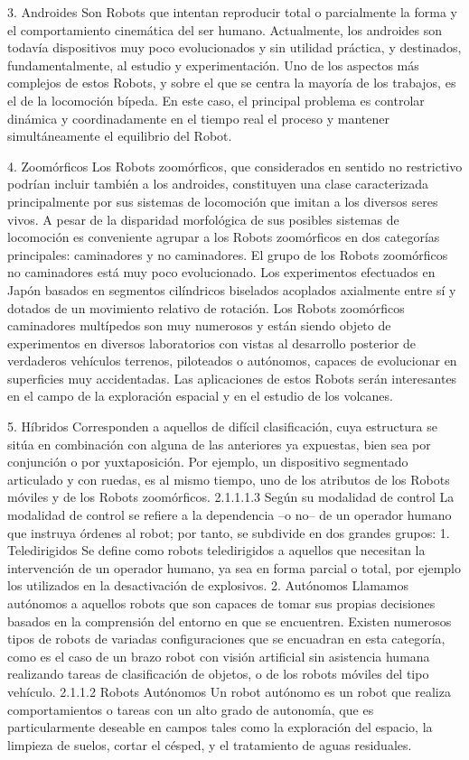 3. Androides
Son Robots que intentan reproducir total o parcialmente la forma y el comportamiento cinemática del ser humano. Actualmente, los androides son todavía dispositivos muy poco evolucionados y sin utilidad práctica, y destinados, fundamentalmente, al estudio y experimentación. Uno de los aspectos más complejos de estos Robots, y sobre el que se centra la mayoría de los trabajos, es el de la locomoción bípeda. En este caso, el principal problema es controlar dinámica y coordinadamente en el tiempo real el proceso y mantener simultáneamente el equilibrio del Robot.

4. Zoomórficos
Los Robots zoomórficos, que considerados en sentido no restrictivo podrían incluir también a los androides, constituyen una clase caracterizada principalmente por sus sistemas de locomoción que imitan a los diversos seres vivos. A pesar de la disparidad morfológica de sus posibles sistemas de locomoción es conveniente agrupar a los Robots zoomórficos en dos categorías principales: caminadores y no caminadores. El grupo de los Robots zoomórficos no caminadores está muy poco evolucionado. Los experimentos efectuados en Japón basados en segmentos cilíndricos biselados acoplados axialmente entre sí y dotados de un movimiento relativo de rotación. Los Robots zoomórficos caminadores multípedos son muy numerosos y están siendo objeto de experimentos en diversos laboratorios con vistas al desarrollo posterior de verdaderos vehículos terrenos, piloteados o autónomos, capaces de evolucionar en superficies muy accidentadas. Las aplicaciones de estos Robots serán interesantes en el campo de la exploración espacial y en el estudio de los volcanes.

5. Híbridos
Corresponden a aquellos de difícil clasificación, cuya estructura se sitúa en combinación con alguna de las anteriores ya expuestas, bien sea por conjunción o por yuxtaposición. Por ejemplo, un dispositivo segmentado articulado y con ruedas, es al mismo tiempo, uno de los atributos de los Robots móviles y de los Robots zoomórficos.
2.1.1.1.3	Según su modalidad de control
La modalidad de control se refiere a la dependencia –o no– de un operador humano que instruya órdenes al robot; por tanto, se subdivide en dos grandes grupos:
1.	Teledirigidos
Se define como robots teledirigidos a aquellos que necesitan la intervención de un operador humano, ya sea en forma parcial o total, por ejemplo los utilizados en la desactivación de explosivos.
2.	Autónomos
Llamamos autónomos a aquellos robots que son capaces de tomar sus propias decisiones basados en la comprensión del entorno en que se encuentren. Existen numerosos tipos de robots de variadas configuraciones que se encuadran en esta categoría, como es el caso de un brazo robot con visión artificial sin asistencia humana realizando tareas de clasificación de objetos, o de los robots móviles del tipo vehículo.
2.1.1.2	Robots Autónomos
Un robot autónomo es un robot que realiza comportamientos o tareas con un alto grado de autonomía, que es particularmente deseable en campos tales como la exploración del espacio, la limpieza de suelos, cortar el césped, y el tratamiento de aguas residuales. 

